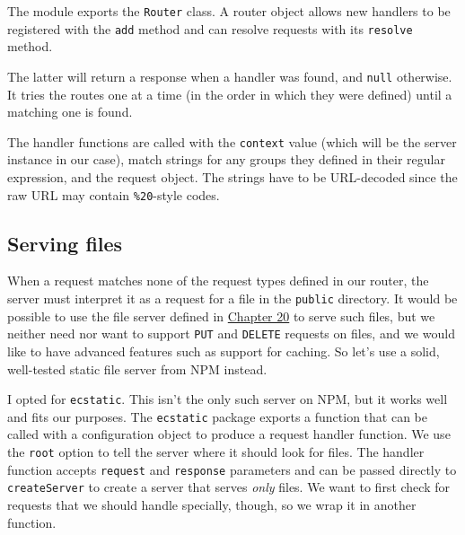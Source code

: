 The module exports the \lstinline`Router` class. A router object allows new handlers to be registered with the \lstinline`add` method and can resolve requests with its \lstinline`resolve` method.

The latter will return a response when a handler was found, and \lstinline`null` otherwise. It tries the routes one at a time (in the order in which they were defined) until a matching one is found.

The handler functions are called with the \lstinline`context` value (which will be the server instance in our case), match strings for any groups they defined in their regular expression, and the request object. The strings have to be URL-decoded since the raw URL may contain \lstinline`%20`-style codes.

\subsection{Serving files}

When a request matches none of the request types defined in our router, the server must interpret it as a request for a file in the \lstinline`public` directory. It would be possible to use the file server defined in \hyperref[node.file_server]{Chapter 20} to serve such files, but we neither need nor want to support \lstinline`PUT` and \lstinline`DELETE` requests on files, and we would like to have advanced features such as support for caching. So let's use a solid, well-tested static file server from NPM instead.

I opted for \lstinline`ecstatic`. This isn't the only such server on NPM, but it works well and fits our purposes. The \lstinline`ecstatic` package exports a function that can be called with a configuration object to produce a request handler function. We use the \lstinline`root` option to tell the server where it should look for files. The handler function accepts \lstinline`request` and \lstinline`response` parameters and can be passed directly to \lstinline`createServer` to create a server that serves \emph{only} files. We want to first check for requests that we should handle specially, though, so we wrap it in another function.


